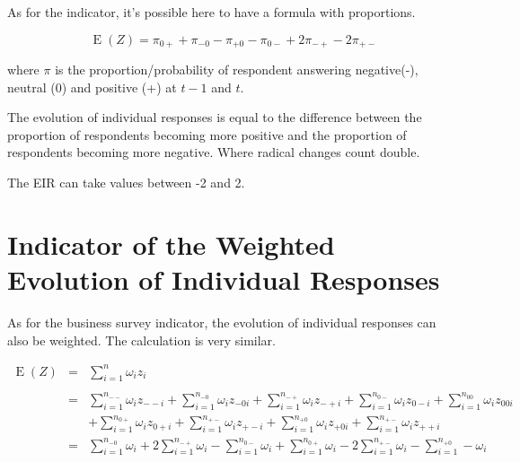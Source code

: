\documentclass[12pt,a4paper,oneside]{book}
\DeclareMathOperator{\E}{E}
\begin{document}
As for the indicator, it's possible here to have a formula with proportions.


\begin{equation}
    \E(Z) = \pi_{0+} + \pi_{-0} - \pi_{+0} - \pi_{0-} +2\pi_{-+} -2\pi_{+-} \label{eq:unweighted proprotion EIR}
\end{equation}

where $\pi$ is the proportion/probability of respondent answering negative(-), neutral (0) and positive (+) at $t-1$ and $t$. 

The evolution of individual responses is equal to the difference between the proportion of respondents becoming more positive and the proportion of respondents becoming more negative. Where radical changes count double.

The EIR can take values between -2 and 2.



\section{Indicator of the Weighted Evolution of Individual Responses}

As for the business survey indicator, the evolution of individual responses can also be weighted. The calculation is very similar.

\begin{eqnarray}
    \E(Z) &=&  \sum_{i=1}^n \omega_i z_i \\ \nonumber \\
        &=& \sum_{i=1}^{n_{--}} \omega_i z_{--i} 
     + \sum_{i=1}^{n_{-0}} \omega_i z_{-0i}  
    + \sum_{i=1}^{n_{-+}} \omega_i z_{-+i} 
    + \sum_{i=1}^{n_{0-}} \omega_i z_{0-i}  
    + \sum_{i=1}^{n_{00}} \omega_i z_{00i}   \nonumber  \\
    &&  + \sum_{i=1}^{n_{0+}} \omega_i z_{0+i} 
    + \sum_{i=1}^{n_{+-}} \omega_i z_{+-i} 
    + \sum_{i=1}^{n_{+0}} \omega_i z_{+0i} 
    + \sum_{i=1}^{n_{+-}} \omega_i z_{++i} \\
&=&  \sum_{i=1}^{n_{-0}} \omega_i  
    + 2 \sum_{i=1}^{n_{-+}} \omega_i  
    - \sum_{i=1}^{n_{0-}} \omega_i         
    + \sum_{i=1}^{n_{0+}} \omega_i  
    - 2 \sum_{i=1}^{n_{+-}} \omega_i 
    - \sum_{i=1}^{n_{+0}} - \omega_i  
\end{eqnarray}
\end{document}
